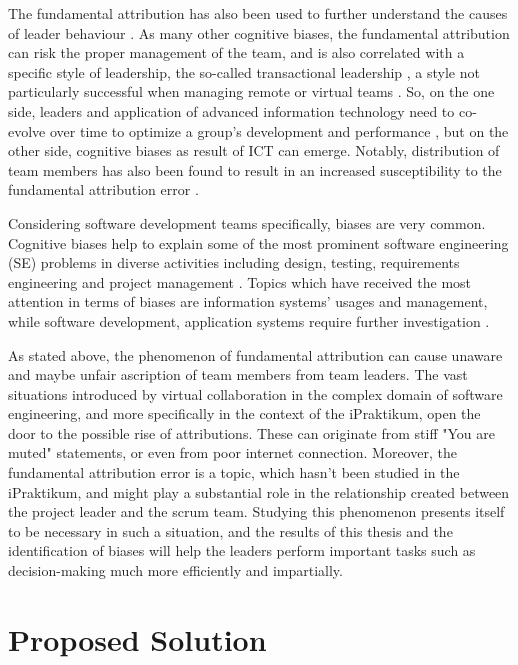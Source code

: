 The fundamental attribution has also been used to further understand the causes of leader behaviour \cite{Green1979}. As many other cognitive biases, the fundamental attribution can risk the proper management of the team, and is also correlated with a specific style of leadership, the so-called transactional leadership \cite{Masood2012}, a style not particularly successful when managing remote or virtual teams \cite{Howell2005} \cite{Purvanova2009}. So, on the one side, leaders and application of advanced information technology need to co-evolve over time to optimize a group's development and performance \cite{Avolio2000}, but on the other side, cognitive biases as result of ICT can emerge. Notably, distribution of team members has also been found to result in an increased susceptibility to the fundamental attribution error \cite{Thompson2006}. 

Considering software development teams specifically, biases are very common. Cognitive biases help to explain some of the most prominent software engineering (SE) problems in diverse activities including design, testing, requirements engineering  and project management \cite{Mohanai2018}. Topics which have received the most attention in terms of biases are information systems' usages and management, while software development, application systems require further investigation \cite{Fleischmann2014}.

As stated above, the phenomenon of fundamental attribution can cause unaware and maybe unfair ascription of team members from team leaders. The vast situations introduced by virtual collaboration in the complex domain of software engineering, and more specifically in the context of the iPraktikum, open the door to the possible rise of attributions. These can originate from stiff "You are muted" statements, or even from poor internet connection. Moreover, the fundamental attribution error is a topic, which hasn't been studied in the iPraktikum, and might play a substantial role in the relationship created between the project leader and the scrum team. Studying this phenomenon presents itself to be necessary in such a situation, and the results of this thesis and the identification of biases will help the leaders perform important tasks such as decision-making much more efficiently and impartially.

\section{Proposed Solution}

